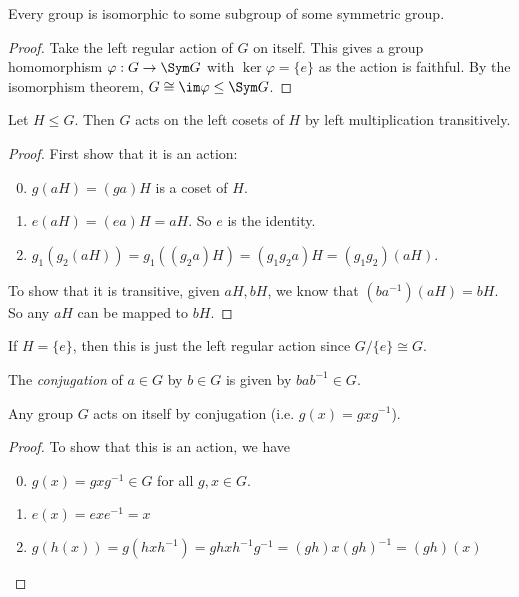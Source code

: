 \documentclass[a4paper]{article}
\begin{document}
  \begin{thm}
    Every group is isomorphic to some subgroup of some symmetric group.
  \end{thm}

  \begin{proof}
    Take the left regular action of $G$ on itself. This gives a group homomorphism $\varphi: G\to \Sym G$ with $\ker \varphi = \{e\}$ as the action is faithful. By the isomorphism theorem, $G \cong \im \varphi \leq \Sym G$.
  \end{proof}

  \begin{lemma}
    Let $H\leq G$. Then $G$ acts on the left cosets of $H$ by left multiplication transitively.
  \end{lemma}

  \begin{proof}
    First show that it is an action:
    \begin{enumerate}[label=\arabic{*}.]
        \setcounter{enumi}{-1}
      \item $g(aH) = (ga)H$ is a coset of $H$.
      \item $e(aH) = (ea)H = aH$. So $e$ is the identity.
      \item $g_1(g_2(aH)) = g_1((g_2a)H) = (g_1g_2a)H = (g_1g_2)(aH)$.
    \end{enumerate}

    To show that it is transitive, given $aH, bH$, we know that $(ba^{-1})(aH) = bH$. So any $aH$ can be mapped to $bH$.
  \end{proof}
  \note If $H = \{e\}$, then this is just the left regular action since $G/\{e\} \cong G$.

  \begin{defi}
    The \emph{conjugation} of $a\in G$ by $b\in G$ is given by $bab^{-1}\in G$.
  \end{defi}

  \begin{lemma}
    Any group $G$ acts on itself by conjugation (i.e. $g(x) = gxg^{-1}$).
  \end{lemma}

  \begin{proof}
    To show that this is an action, we have
    \begin{enumerate}[label=\arabic{*}.]
        \setcounter{enumi}{-1}
      \item $g(x) = gxg^{-1} \in G$ for all $g, x\in G$.
      \item $e(x) = exe^{-1} = x$
      \item $g(h(x)) = g(hxh^{-1}) = ghxh^{-1}g^{-1} = (gh)x(gh)^{-1} = (gh)(x)$
    \end{enumerate}
  \end{proof}
\end{document}
